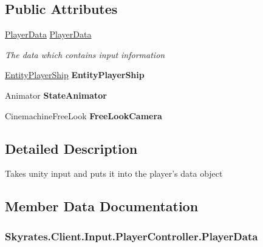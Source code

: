 \subsection*{Public Attributes}
\begin{DoxyCompactItemize}
\item 
\hyperlink{class_skyrates_1_1_data_1_1_player_data}{Player\-Data} \hyperlink{class_skyrates_1_1_client_1_1_input_1_1_player_controller_ae2f6ad16048cdb9690eba17f0adac164}{Player\-Data}
\begin{DoxyCompactList}\small\item\em The data which contains input information \end{DoxyCompactList}\item 
\hypertarget{class_skyrates_1_1_client_1_1_input_1_1_player_controller_af22cb5bc6bbb4f00ea725b3469b38cfb}{\hyperlink{class_skyrates_1_1_entity_1_1_entity_player_ship}{Entity\-Player\-Ship} {\bfseries Entity\-Player\-Ship}}\label{class_skyrates_1_1_client_1_1_input_1_1_player_controller_af22cb5bc6bbb4f00ea725b3469b38cfb}

\item 
\hypertarget{class_skyrates_1_1_client_1_1_input_1_1_player_controller_afd3f00de752989426128df1f8e00b390}{Animator {\bfseries State\-Animator}}\label{class_skyrates_1_1_client_1_1_input_1_1_player_controller_afd3f00de752989426128df1f8e00b390}

\item 
\hypertarget{class_skyrates_1_1_client_1_1_input_1_1_player_controller_a040254de32a2f00b7de202512e70dce7}{Cinemachine\-Free\-Look {\bfseries Free\-Look\-Camera}}\label{class_skyrates_1_1_client_1_1_input_1_1_player_controller_a040254de32a2f00b7de202512e70dce7}

\end{DoxyCompactItemize}


\subsection{Detailed Description}
Takes unity input and puts it into the player's data object 



\subsection{Member Data Documentation}
\hypertarget{class_skyrates_1_1_client_1_1_input_1_1_player_controller_ae2f6ad16048cdb9690eba17f0adac164}{
\subsubsection[{Player\-Data}]{ Skyrates.\-Client.\-Input.\-Player\-Controller.\-Player\-Data}}\label{class_skyrates_1_1_client_1_1_input_1_1_player_controller_ae2f6ad16048cdb9690eba17f0adac164}


